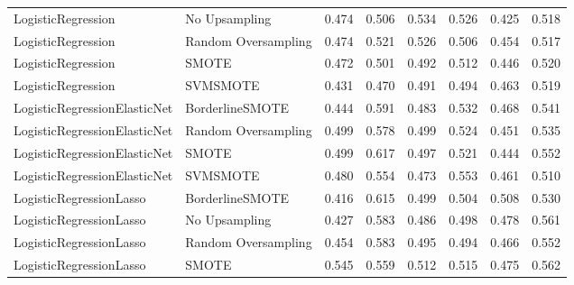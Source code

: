\begin{tabular}{llllllll}
          LogisticRegression &       No Upsampling & 0.474 &                     0.506 &                 0.534 &                  0.526 &                                   0.425 &     0.518 \\
          LogisticRegression & Random Oversampling & 0.474 &                     0.521 &                 0.526 &                  0.506 &                                   0.454 &     0.517 \\
          LogisticRegression &               SMOTE & 0.472 &                     0.501 &                 0.492 &                  0.512 &                                   0.446 &     0.520 \\
          LogisticRegression &            SVMSMOTE & 0.431 &                     0.470 &                 0.491 &                  0.494 &                                   0.463 &     0.519 \\
LogisticRegressionElasticNet &     BorderlineSMOTE & 0.444 &                     0.591 &                 0.483 &                  0.532 &                                   0.468 &     0.541 \\
LogisticRegressionElasticNet & Random Oversampling & 0.499 &                     0.578 &                 0.499 &                  0.524 &                                   0.451 &     0.535 \\
LogisticRegressionElasticNet &               SMOTE & 0.499 &                     0.617 &                 0.497 &                  0.521 &                                   0.444 &     0.552 \\
LogisticRegressionElasticNet &            SVMSMOTE & 0.480 &                     0.554 &                 0.473 &                  0.553 &                                   0.461 &     0.510 \\
     LogisticRegressionLasso &     BorderlineSMOTE & 0.416 &                     0.615 &                 0.499 &                  0.504 &                                   0.508 &     0.530 \\
     LogisticRegressionLasso &       No Upsampling & 0.427 &                     0.583 &                 0.486 &                  0.498 &                                   0.478 &     0.561 \\
     LogisticRegressionLasso & Random Oversampling & 0.454 &                     0.583 &                 0.495 &                  0.494 &                                   0.466 &     0.552 \\
     LogisticRegressionLasso &               SMOTE & 0.545 &                     0.559 &                 0.512 &                  0.515 &                                   0.475 &     0.562 \\

\end{tabular}

